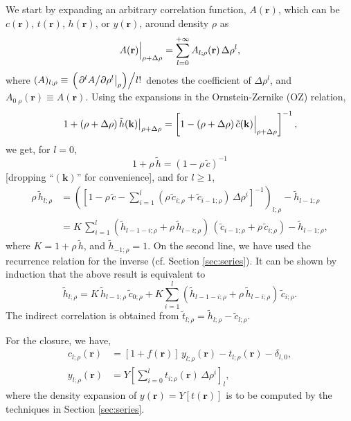 \documentclass[aip,jcp,preprint,superscriptaddress,showpacs,preprintnumbers,amsmath,amssymb]{revtex4-1}
\numberwithin{equation}{section}
\newcommand{\vct}[1]{\mathbf{#1}}
\providecommand{\vr}{} %
\renewcommand{\vr}{\vct{r}}
\newcommand{\vk}{\vct{k}}
\begin{document}
We start by expanding
an arbitrary correlation function, $A(\vr)$,
which can be $c(\vr)$, $t(\vr)$, $h(\vr)$, or $y(\vr)$,
around density $\rho$ as
%
\[
\Bigl. A(\vr) \Bigr|_{\rho + \Delta \rho}
=
\sum_{l = 0}^{+\infty}
A_{l;\rho}(\vr) \, \Delta \rho^l,
\]
%
where
%
$(A)_{l;\rho} \equiv
\left.
  \left(
    \left.
      \partial^l A
    \middle/
      \partial \rho^l
    \right|_\rho
  \right)
\middle/
  l!
\right.$
%
denotes the coefficient of $\Delta \rho^l$,
and
$A_{0\;\rho}(\vr) \equiv A(\vr)$.
%
Using the expansions in the Ornstein-Zernike (OZ) relation,
\[
\left.
  1 + (\rho + \Delta\rho) \, \tilde h(\vk)
\right|_{\rho + \Delta \rho}
=
\left[
  \Bigl.
    1 - (\rho + \Delta\rho) \, \tilde c(\vk)
  \Bigr|_{\rho + \Delta \rho}
\right]^{-1},
\]
we get, for $l = 0$,
\[
1 + \rho \, \tilde h
=
(1 - \rho \, \tilde c)^{-1}
\]
[dropping ``$(\vk)$'' for convenience],
and for $l \ge 1$,
%
%
%
\begin{align*}
\rho \, \tilde h_{l;\rho}
&=
\left(
  \left[
    1 - \rho \, \tilde c
    - \sum_{i=1}^l (\rho \, \tilde c_{i;\rho}
                  + \tilde c_{i-1;\rho}) \, \Delta \rho^i
  \right]^{-1}
\right)_{l;\rho}
- \tilde h_{l-1;\rho}
\\
&=
K \,
\sum_{i = 1}^l
(\tilde h_{l - 1 - i; \rho}
+ \rho \, \tilde h_{l - i; \rho})
\,
(\tilde c_{i-1; \rho}
+ \rho \, \tilde c_{i; \rho})
- \tilde h_{l-1; \rho},
\end{align*}
%
%
%
where $K = 1 + \rho \, \tilde h$,
and $\tilde h_{-1;\rho} = 1$.
%
On the second line,
we have used the recurrence relation
for the inverse (cf. Section \ref{sec:series}).
%
It can be shown by induction
that the above result is equivalent to
%
\begin{equation*}
\tilde h_{l;\rho}
=
K \, \tilde h_{l-1;\rho} \, \tilde c_{0;\rho}
+
K \sum_{i=1}^l
  (\tilde h_{l-1-i;\rho} + \rho \, \tilde h_{l-i;\rho}) \,
  \tilde c_{i;\rho}.
\end{equation*}
%
The indirect correlation is obtained from
$\tilde t_{l;\rho}
=
\tilde h_{l;\rho}
-
\tilde c_{l;\rho}.$



For the closure, we have,
%
\begin{align*}
c_{l;\rho}(\vr)
&=
[1 + f(\vr)] \, y_{l;\rho}(\vr)
- t_{l;\rho}(\vr) - \delta_{l,0},
\\
y_{l;\rho}(\vr)
&=
Y\left[
\sum_{i = 0}^l t_{i;\rho}(\vr) \, \Delta \rho^i
\right]_l,
\end{align*}
%
where
the density expansion of $y(\vr) = Y[t(\vr)]$
is to be computed by the techniques
in Section \ref{sec:series}.
\end{document}
